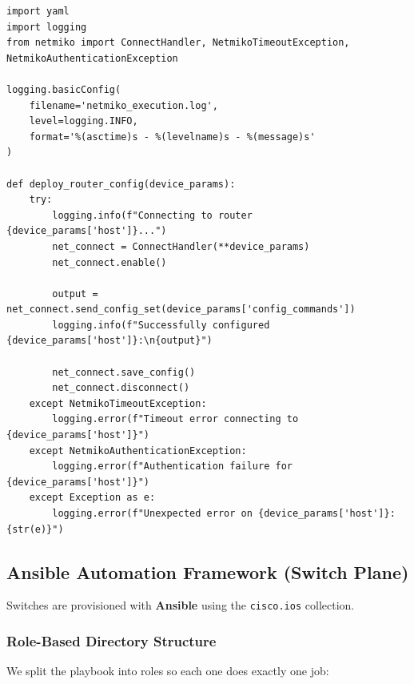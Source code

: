 \documentclass[11pt,a4paper]{article}
\begin{document}
\begin{lstlisting}[style=pythonstyle, caption={Netmiko Router Automation Snippet}]
import yaml
import logging
from netmiko import ConnectHandler, NetmikoTimeoutException, NetmikoAuthenticationException

logging.basicConfig(
    filename='netmiko_execution.log',
    level=logging.INFO,
    format='%(asctime)s - %(levelname)s - %(message)s'
)

def deploy_router_config(device_params):
    try:
        logging.info(f"Connecting to router {device_params['host']}...")
        net_connect = ConnectHandler(**device_params)
        net_connect.enable()

        output = net_connect.send_config_set(device_params['config_commands'])
        logging.info(f"Successfully configured {device_params['host']}:\n{output}")

        net_connect.save_config()
        net_connect.disconnect()
    except NetmikoTimeoutException:
        logging.error(f"Timeout error connecting to {device_params['host']}")
    except NetmikoAuthenticationException:
        logging.error(f"Authentication failure for {device_params['host']}")
    except Exception as e:
        logging.error(f"Unexpected error on {device_params['host']}: {str(e)}")
\end{lstlisting}

\subsection{Ansible Automation Framework (Switch Plane)}

Switches are provisioned with \textbf{Ansible} using the \texttt{cisco.ios} collection.

\subsubsection{Role-Based Directory Structure}
We split the playbook into roles so each one does exactly one job:
\end{document}
